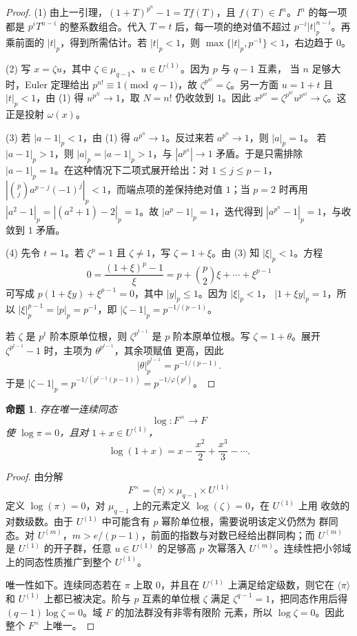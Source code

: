 \documentclass[11pt,a4paper,openany]{ctexbook}
\numberwithin{equation}{chapter}
\theoremstyle{plain}
\newtheorem{proposition}[theorem]{命题}
\theoremstyle{definition}
\theoremstyle{remark}
\begin{document}
\begin{proof}
(1) 由上一引理，$(1+T)^{p^n}-1=T f(T)$，且 $f(T)\in I^n$。$I^n$ 的每一项都是
$p^iT^{n-i}$ 的整系数组合。代入 $T=t$ 后，每一项的绝对值不超过
$p^{-i}|t|_p^{n-i}$。再乘前面的 $|t|_p$，得到所需估计。若 $|t|_p<1$，则
\(\max\{|t|_p,p^{-1}\}<1\)，右边趋于 $0$。

(2) 写 $x=\zeta u$，其中 $\zeta\in\mu_{q-1}$、$u\in U^{(1)}$。因为 $p$ 与 $q-1$ 互素，
当 $n$ 足够大时，Euler 定理给出 $p^{n!}\equiv1\pmod {q-1}$，故
$\zeta^{p^{n!}}=\zeta$。另一方面 $u=1+t$ 且 $|t|_p<1$，由 (1) 得
$u^{p^N}\to1$，取 $N=n!$ 仍收敛到 $1$。因此
$x^{p^{n!}}=\zeta^{p^{n!}}u^{p^{n!}}\to\zeta$。这正是投射 $\omega(x)$。

(3) 若 $|a-1|_p<1$，由 (1) 得 $a^{p^n}\to1$。反过来若 $a^{p^n}\to1$，则 $|a|_p=1$。
若 $|a-1|_p>1$，则 $|a|_p=|a-1|_p>1$，与 $|a^{p^n}|\to1$ 矛盾。于是只需排除
$|a-1|_p=1$。在这种情况下二项式展开给出：对 $1\le j\le p-1$，
$|\binom pj a^{p-j}(-1)^j|_p<1$，而端点项的差保持绝对值 $1$；当 $p=2$ 时再用
$|a^2-1|_p=|(a^2+1)-2|_p=1$。故 $|a^p-1|_p=1$，迭代得到
$|a^{p^n}-1|_p=1$，与收敛到 $1$ 矛盾。

(4) 先令 $t=1$。若 $\zeta^p=1$ 且 $\zeta\ne1$，写 $\zeta=1+\xi$。由 (3) 知
 $|\xi|_p<1$。方程
\[
0=\frac{(1+\xi)^p-1}{\xi}
=p+\binom p2\xi+\cdots+\xi^{p-1}
\]
可写成 $p(1+\xi y)+\xi^{p-1}=0$，其中 $|y|_p\le1$。因为 $|\xi|_p<1$，
$|1+\xi y|_p=1$，所以 $|\xi|_p^{p-1}=|p|_p=p^{-1}$，即
$|\zeta-1|_p=p^{-1/(p-1)}$。

若 $\zeta$ 是 $p^t$ 阶本原单位根，则 $\zeta^{p^{t-1}}$ 是 $p$ 阶本原单位根。写
$\zeta=1+\theta$。展开 $\zeta^{p^{t-1}}-1$ 时，主项为 $\theta^{p^{t-1}}$，其余项赋值
更高，因此
\[
|\theta|_p^{p^{t-1}}=p^{-1/(p-1)}.
\]
于是 $|\zeta-1|_p=p^{-1/(p^{t-1}(p-1))}=p^{-1/\varphi(p^t)}$。
\end{proof}

\begin{proposition}
存在唯一连续同态
\[
\log:F^\times\to F
\]
使 $\log\pi=0$，且对 $1+x\in U^{(1)}$，
\[
\log(1+x)=x-\frac{x^2}{2}+\frac{x^3}{3}-\cdots.
\]
\end{proposition}

\begin{proof}
由分解
\[
F^\times=\langle\pi\rangle\times\mu_{q-1}\times U^{(1)}
\]
定义 $\log(\pi)=0$，对 $\mu_{q-1}$ 上的元素定义 $\log(\zeta)=0$，在 $U^{(1)}$ 上用
收敛的对数级数。由于 $U^{(1)}$ 中可能含有 $p$ 幂阶单位根，需要说明该定义仍然为
群同态。对 $U^{(m)}$，$m>e/(p-1)$，前面的指数与对数已经给出群同构；而
$U^{(m)}$ 是 $U^{(1)}$ 的开子群，任意 $u\in U^{(1)}$ 的足够高 $p$ 次幂落入
$U^{(m)}$。连续性把小邻域上的同态性质推广到整个 $U^{(1)}$。

唯一性如下。连续同态若在 $\pi$ 上取 $0$，并且在 $U^{(1)}$ 上满足给定级数，则它在
$\langle\pi\rangle$ 和 $U^{(1)}$ 上都已被决定。阶与 $p$ 互素的单位根 $\zeta$ 满足
$\zeta^{q-1}=1$，把同态作用后得 $(q-1)\log\zeta=0$。域 $F$ 的加法群没有非零有限阶
元素，所以 $\log\zeta=0$。因此整个 $F^\times$ 上唯一。
\end{proof}
\end{document}
